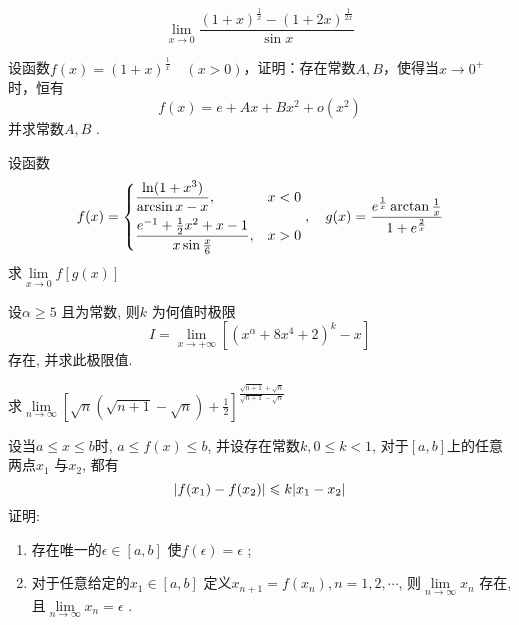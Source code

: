 \begin{question}
    \begin{equation*}
        \lim_{x \to 0} \frac{ ( 1 + x )^{ \frac{1}{x} } -( 1 + 2x )^{ \frac{1}{2x} } }{ \sin x }
    \end{equation*}
\end{question}

\begin{question}
    设函数$ f(x) = (1 + x)^{\frac{1}{x}} \quad (x > 0) $，证明：存在常数$ A, B $，使得当$ x \to 0^+ $时，恒有
    \begin{equation*}
        f(x) = e + Ax +Bx^2 + o(x^2)
    \end{equation*}   
    并求常数$ A, B $ .
\end{question}

\begin{question}
    设函数
    \begin{equation*}
        f(x) = \begin{dcases}
            \frac{ \ln(1 + x^3) }{ \arcsin x - x }, & x < 0   \\
            \frac{ e^{-1} + \frac{1}{2} x^2 + x -1 }{ x \sin \frac{x}{6} }, & x > 0
        \end{dcases}, \quad g(x) = \frac{ e^{\frac{1}{x}} \arctan \frac{1}{x} }{ 1 + e^{\frac{2}{x}} }
    \end{equation*}
    求$ \lim\limits_{x \to 0} f [ g( x ) ] $ 
\end{question}

\begin{question}
    设$ \alpha \ge 5 $ 且为常数, 则$ k $ 为何值时极限
    \begin{equation*}
        I = \lim_{x \to + \infty} [( x^\alpha + 8x^4 +2 )^k - x]
    \end{equation*}
    存在, 并求此极限值.
\end{question}

\begin{question}
    求$ \lim\limits_{n \to \infty} [ \sqrt{n} ( \sqrt{ n + 1 } - \sqrt{n} ) + \frac{1}{2} ]^{\frac{ \sqrt{ n + 1 } + \sqrt{n} }{ \sqrt{ n + 1 } -\sqrt{n} }} $ 
\end{question}

\begin{question}
    设当$ a \le x \le b $时, $ a \le f(x) \le b $, 并设存在常数$ k, 0 \le k < 1 $, 对于$ [a, b] $上的任意两点$ x_1 $ 与$ x_2 $, 都有
    \begin{equation*}
        \lvert f(x_1) - f(x_2) \rvert \leqslant k \lvert x_1 - x_2 \rvert
    \end{equation*}
    证明:
    \begin{enumerate}
        \item 存在唯一的$ \epsilon \in [a, b] $ 使$ f(\epsilon) = \epsilon $ ;
        \item 对于任意给定的$ x_1 \in [a, b] $ 定义$ x_{n + 1} = f(x_n), n = 1,2,\cdots $, 则$ \lim\limits_{n \to \infty} x_n $ 存在, 且$ \lim\limits_{n \to \infty} x_n = \epsilon $ . 
    \end{enumerate}      
\end{question}